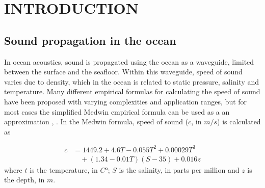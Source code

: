 \documentclass[fleqn]{jaes}
\begin{document}




\section{INTRODUCTION}

\subsection{Sound propagation in the ocean}
In ocean acoustics, sound is propagated using the ocean as a waveguide, limited between the surface and the seafloor. Within this waveguide, speed of sound varies due to density, which in the ocean is related to static pressure, salinity and temperature. Many different empirical formulas for calculating the speed of sound have been proposed \cite{Huang} with varying complexities and application ranges, but for most cases the simplified Medwin empirical formula can be used as a an approximation \cite{Jensen}, \cite{Lurton}. In the Medwin formula, speed of sound ($c$, in $m/s$) is calculated as 

\begin{equation}
\begin{split}
c &= 1449.2 + 4.6T - 0.055T^2 + 0.00029T^3 \\
  &\quad + (1.34 - 0.01T)(S-35) + 0.016z
\end{split}
\label{eq:speedofsound}
\end{equation}
where $t$ is the temperature, in $C$°; $S$ is the salinity, in parts per million and $z$ is the depth, in $m$. 
\end{document}
